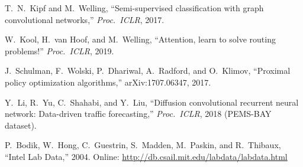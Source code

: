 {\begin{enumerate}[label={[\arabic*]},leftmargin=1cm,itemsep=0.15em]
  \item T.~N.~Kipf and M.~Welling, ``Semi-supervised classification with graph convolutional networks,'' \emph{Proc.\ ICLR}, 2017.
  \item W.~Kool, H.~van Hoof, and M.~Welling, ``Attention, learn to solve routing problems!'' \emph{Proc.\ ICLR}, 2019.
  \item J.~Schulman, F.~Wolski, P.~Dhariwal, A.~Radford, and O.~Klimov, ``Proximal policy optimization algorithms,'' arXiv:1707.06347, 2017.
  \item Y.~Li, R.~Yu, C.~Shahabi, and Y.~Liu, ``Diffusion convolutional recurrent neural network: Data-driven traffic forecasting,'' \emph{Proc.\ ICLR}, 2018 (PEMS-BAY dataset).
  \item P.~Bodik, W.~Hong, C.~Guestrin, S.~Madden, M.~Paskin, and R.~Thibaux, ``Intel Lab Data,'' 2004. Online: \url{http://db.csail.mit.edu/labdata/labdata.html}
\end{enumerate}
}
